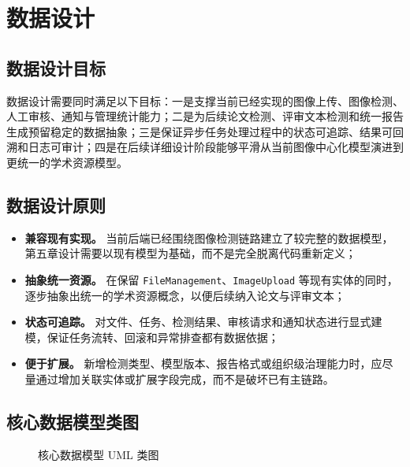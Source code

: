 \section{数据设计}

\subsection{数据设计目标}
数据设计需要同时满足以下目标：一是支撑当前已经实现的图像上传、图像检测、人工审核、通知与管理统计能力；二是为后续论文检测、评审文本检测和统一报告生成预留稳定的数据抽象；三是保证异步任务处理过程中的状态可追踪、结果可回溯和日志可审计；四是在后续详细设计阶段能够平滑从当前图像中心化模型演进到更统一的学术资源模型。

\subsection{数据设计原则}
\begin{itemize}[leftmargin=2em]
    \item \textbf{兼容现有实现。} 当前后端已经围绕图像检测链路建立了较完整的数据模型，第五章设计需要以现有模型为基础，而不是完全脱离代码重新定义；
    \item \textbf{抽象统一资源。} 在保留 \texttt{FileManagement}、\texttt{ImageUpload} 等现有实体的同时，逐步抽象出统一的学术资源概念，以便后续纳入论文与评审文本；
    \item \textbf{状态可追踪。} 对文件、任务、检测结果、审核请求和通知状态进行显式建模，保证任务流转、回滚和异常排查都有数据依据；
    \item \textbf{便于扩展。} 新增检测类型、模型版本、报告格式或组织级治理能力时，应尽量通过增加关联实体或扩展字段完成，而不是破坏已有主链路。
\end{itemize}

\subsection{核心数据模型类图}
\begin{figure}[H]
    \centering
    \resizebox{0.98\textwidth}{!}{}
    \caption{核心数据模型 UML 类图}
\end{figure}


